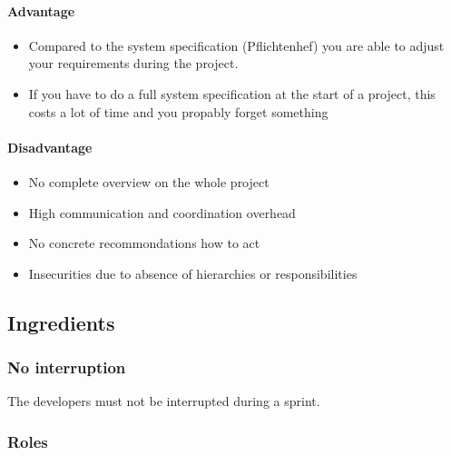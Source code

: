 \hypertarget{advantage}{%
\paragraph{Advantage}\label{advantage}}

\begin{itemize}
\tightlist
\item
  Compared to the system specification (Pflichtenhef) you are able to
  adjust your requirements during the project.
\item
  If you have to do a full system specification at the start of a
  project, this costs a lot of time and you propably forget something
\end{itemize}

\hypertarget{disadvantage}{%
\paragraph{Disadvantage}\label{disadvantage}}
\begin{itemize}
\tightlist
\item
    No complete overview on the whole project 
\item
    High communication and coordination overhead
\item
    No concrete recommondations how to act
\item
    Insecurities due to absence of hierarchies or responsibilities
\end{itemize}

\hypertarget{ingredients}{%
\subsection{Ingredients}\label{ingredients}}

\hypertarget{no-interruption}{%
\subsubsection{No interruption}\label{no-interruption}}

The developers must not be interrupted during a sprint.

\hypertarget{roles}{%
\subsubsection{Roles}\label{roles}}


